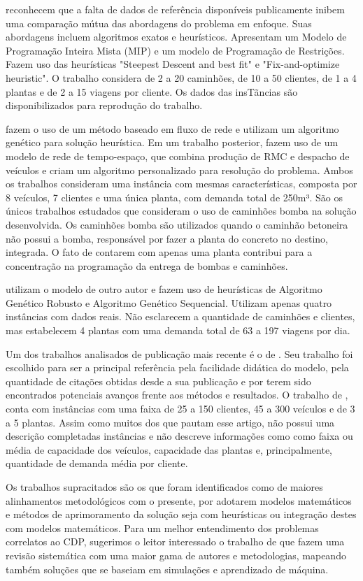 \cite{tabref9} reconhecem que a falta de dados de referência disponíveis publicamente inibem uma comparação mútua das abordagens do problema em enfoque. Suas abordagens incluem algoritmos exatos e heurísticos. Apresentam um Modelo de Programação Inteira Mista (MIP) e um modelo de Programação de Restrições. Fazem uso das heurísticas "Steepest Descent and best fit" e "Fix-and-optimize heuristic". O trabalho considera de 2 a 20 caminhões, de 10 a 50 clientes, de 1 a 4 plantas e de 2 a 15 viagens por cliente. Os dados das insTãncias são disponibilizados para reprodução do trabalho.

\cite{tabref10} fazem o uso de um método baseado em fluxo de rede e utilizam um algoritmo genético para solução heurística. Em um trabalho posterior, \cite{tabref12} fazem uso de um modelo de rede de tempo-espaço, que combina produção de RMC e despacho de veículos e criam um algoritmo personalizado para resolução do problema. Ambos os trabalhos consideram uma instância com mesmas características, composta por 8 veículos, 7 clientes e uma única planta, com demanda total de 250m³. São os únicos trabalhos estudados que consideram o uso de caminhões bomba na solução desenvolvida. Os caminhões bomba são utilizados quando o caminhão betoneira não possui a bomba, responsável por fazer a planta do concreto no destino, integrada. O fato de contarem com apenas uma planta contribui para a concentração na programação da entrega de bombas e caminhões.


\cite{tabref11} utilizam o modelo de outro autor e fazem uso de heurísticas de Algoritmo Genético Robusto e Algoritmo Genético Sequencial. Utilizam apenas quatro instâncias com dados reais. Não esclarecem a quantidade de caminhões e clientes, mas estabelecem 4 plantas com uma demanda total de 63 a 197 viagens por dia.


Um dos trabalhos analisados de publicação mais recente é o de \cite{cantu}. Seu trabalho foi escolhido para ser a principal referência pela facilidade didática do modelo, pela quantidade de citações obtidas desde a sua publicação e por terem sido encontrados potenciais avanços frente aos métodos e resultados. O trabalho de \cite{cantu}, conta com instâncias com uma faixa de 25 a 150 clientes, 45 a 300 veículos e de 3 a 5 plantas. Assim como muitos dos que pautam esse artigo, não possui uma descrição completadas instâncias e não descreve informações como como faixa ou média de capacidade dos veículos, capacidade das plantas e, principalmente, quantidade de demanda média por cliente.

Os trabalhos supracitados são os que foram identificados como de maiores alinhamentos metodológicos com o presente, por adotarem modelos matemáticos e métodos de aprimoramento da solução seja com heurísticas ou integração destes com modelos matemáticos. Para um melhor entendimento dos problemas correlatos ao CDP, sugerimos
o leitor interessado o trabalho de \cite{tzanetos} que fazem uma revisão sistemática com uma maior gama de autores e metodologias, mapeando também soluções que se baseiam em simulações e aprendizado de máquina. 
